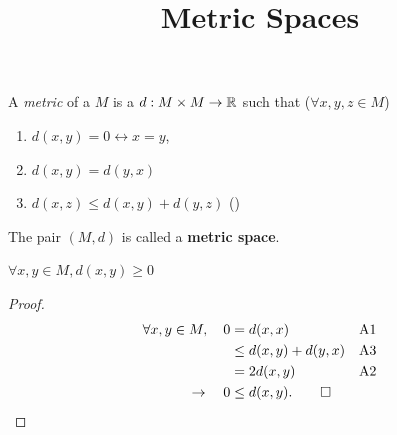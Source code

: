 \documentclass{atomic}
\title{Metric Spaces}
\begin{document}
    \pagestyle{plain}  \noindent
    A \textit{metric} of a  $M$ is a  $d : M \times M \to \mathbb{R}$ such that ($\forall x,y,z \in M$)
    \begin{enumerate}
        \item $d(x,y) = 0 \leftrightarrow x = y$,
        \item $d(x, y) = d(y, x)$
        \item $d(x,z) \le d(x,y) + d(y,z)$ \hspace{1em} ()
    \end{enumerate}

    \begin{definition}
        The pair $\left( M,d \right)$ is called a \textbf{metric space}.
    \end{definition}

    \begin{theorem} [Positivity] \label{positivity}
        $\forall x, y \in M, d(x,y) \ge 0$
    \end{theorem}
    \begin{proof}
        \phantom{}\vspace{-2em}
        \begin{align*}
            \forall x,y \in M,\hspace{1em} 0 &= d(x,x) && \text{A1} \\
            &\le d(x,y) + d(y,x) && \text{A3} \\
            &= 2d(x,y) && \text{A2} \\
            \to \hspace{1em} 0 &\le d(x,y). \qed
        \end{align*}
    \end{proof}
    
\end{document}
